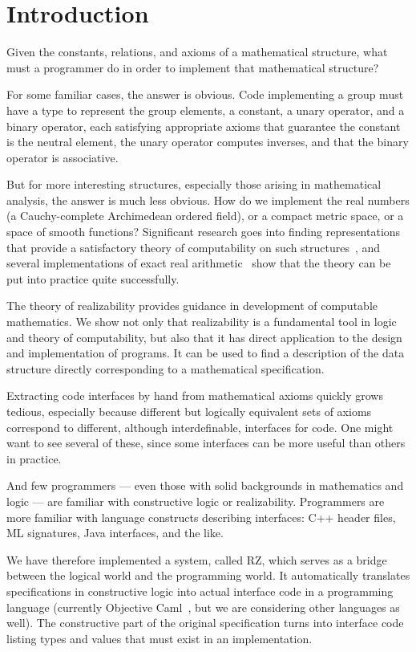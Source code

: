 \section{Introduction}
\label{sec:introduction}

Given the constants, relations, and axioms of a mathematical
structure, what must a programmer do in order to implement that
mathematical structure?

For some familiar cases, the answer is obvious. Code implementing a
group must have a type to represent the group elements, a constant, a
unary operator, and a binary operator, each satisfying appropriate
axioms that guarantee the constant is the neutral element, the unary
operator computes inverses, and that the binary operator is
associative.

But for more interesting structures, especially those arising in
mathematical analysis, the answer is much less obvious. How do we
implement the real numbers (a Cauchy-complete Archimedean ordered
field), or a compact metric space, or a space of smooth functions?
Significant research goes into finding representations that provide a
satisfactory theory of computability on such
structures~\cite{Wei00,TZ98,Bla97,EL00}, and several implementations
of exact real arithmetic~\cite{Mue00,Lam05a} show that the theory can
be put into practice quite successfully.

The theory of realizability provides guidance in development of
computable mathematics. We show not only that realizability is a
fundamental tool in logic and theory of computability, but also that
it has direct application to the design and implementation of
programs. It can be used to find a description of the data structure
directly corresponding to a mathematical specification.

Extracting code interfaces by hand from mathematical axioms quickly
grows tedious, especially because different but logically equivalent
sets of axioms correspond to different, although interdefinable,
interfaces for code. One might want to see several of these, since
some interfaces can be more useful than others in practice.

And few programmers --- even those with solid backgrounds in
mathematics and logic --- are familiar with constructive logic or
realizability. Programmers are more familiar with language constructs
describing interfaces: C++ header files, ML signatures, Java
interfaces, and the like.

\bigskip

We have therefore implemented a system, called RZ, which serves as a
bridge between the logical world and the programming world. It
automatically translates specifications in constructive logic into
actual interface code in a programming language (currently Objective
Caml~\cite{ocaml}, but we are considering other languages as well). The
constructive part of the original specification turns into interface
code listing types and values that must exist in an implementation.

